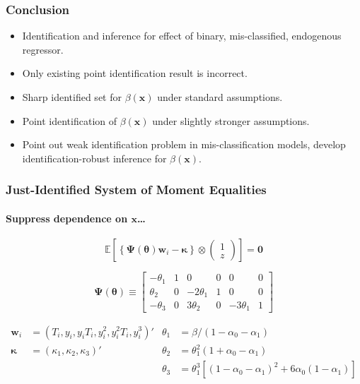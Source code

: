 \documentclass[handout]{beamer}
\begin{document}
\begin{frame}
  \frametitle{Conclusion}

  \begin{itemize}
    \item Identification and inference for effect of binary, mis-classified, endogenous regressor.
    \item Only existing point identification result is incorrect. 
    \item Sharp identified set for $\beta(\mathbf{x})$ under standard assumptions.
    \item Point identification of $\beta(\mathbf{x})$ under slightly stronger assumptions.
    \item Point out weak identification problem in mis-classification models, develop identification-robust inference for $\beta(\mathbf{x})$. 
  \end{itemize}


\end{frame}
\appendix
\begin{frame}[label=MEQS_APPEND]
  \frametitle{Just-Identified System of Moment Equalities}
  \framesubtitle{Suppress dependence on $\mathbf{x}$\dots} 

  \small
\[
\mathbb{E}\left[
  \left\{\boldsymbol{\Psi}(\boldsymbol{\theta})\mathbf{w}_i - \boldsymbol{\kappa}\right\} \otimes 
\left(
\begin{array}{c}
  1 \\ z
\end{array}\right)
\right] = \mathbf{0}
\]

  \footnotesize
\[
  \boldsymbol{\Psi}(\boldsymbol{\theta}) \equiv
 \left[
  \begin{array}{rrrrrr}
    -\theta_1 & 1 & 0 & 0 & 0 & 0\\
    \theta_2 & 0 & -2\theta_1 & 1 & 0 & 0\\ 
    -\theta_3 & 0 & 3\theta_2 & 0 & -3\theta_1 & 1
\end{array}\right]
\]

  \begin{align*}
\mathbf{w}_i &= (T_i, y_i, y_iT_i, y_i^2, y_i^2 T_i, y_i^3)' &
  \theta_1 &= \beta/(1 - \alpha_0 - \alpha_1) \\
\boldsymbol{\kappa} &= (\kappa_1, \kappa_2, \kappa_3)'  &
  \theta_2 &= \theta_1^2 (1 + \alpha_0 - \alpha_1)\\
  & & \theta_3 &= \theta_1^3\left[ (1 - \alpha_0 - \alpha_1)^2 + 6\alpha_0(1 - \alpha_1) \right] 
\end{align*}

    \hyperlink{INEQ_BODY}{}
\end{frame}
\end{document}
